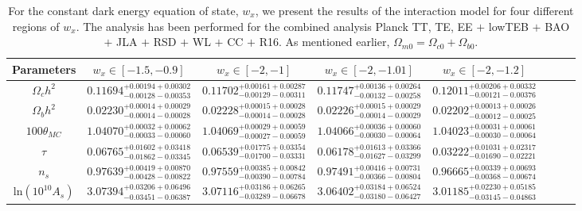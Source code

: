 \documentclass[superscriptaddress,oneolumn,secnumarabic,
amssymb,amsmath,nobibnotes,aps,prd,showpacs,nofootinbib]{revtex4}%
\begin{document}
\begin{itemize}
\begin{table}%
\caption{For the constant dark energy
equation of state, $w_x$, we present the results of the interaction model for
four different regions of $w_x$. The analysis has been performed for
the combined analysis Planck TT, TE, EE $+$ lowTEB $+$ BAO $+$ JLA $+$ RSD $+$ WL $+$ CC $+$ R16. As mentioned earlier, $\Omega_{m0}= \Omega_{c0}+\Omega_{b0}$.  }
\begin{tabular}{cccccccc}
\hline\hline
Parameters & $w_x \in [-1.5, -0.9]$ &  $w_x \in [-2, -1]$ & $w_x \in [-2, -1.01]$ &  $w_x \in [-2, -1.2]$
\\ \hline
$\Omega_ch^2$ & $ 0.11694_{-    0.00128-    0.00353}^{+    0.00194+    0.00302}$ & $    0.11702_{-    0.00129-    0.00311}^{+    0.00161+    0.00287}$ & $0.11747_{-    0.00132-    0.00258}^{+    0.00136+    0.00264}$ & $    0.12011_{-    0.00121-    0.00376}^{+    0.00206+    0.00332}$\\

$\Omega_bh^2$  &  $ 0.02230_{-    0.00014-    0.00028}^{+    0.00014+    0.00029}$ & $0.02228_{-    0.00014-    0.00028}^{+    0.00015+    0.00028}$ & $0.02226_{- 0.00014-    0.00029}^{+    0.00015+    0.00029}$ & $ 0.02202_{-    0.00012-    0.00025}^{+    0.00013+    0.00026}$\\

$100\theta_{MC}$ & $ 1.04070_{- 0.00033-    0.00060}^{+    0.00032+    0.00062}$ & $    1.04069_{-    0.00027-    0.00059}^{+ 0.00029+ 0.00059}$ & $1.04066_{-    0.00030-    0.00064}^{+    0.00036+    0.00060}$ &$ 1.04023_{- 0.00030-    0.00064}^{+    0.00031+    0.00061}$\\


$\tau$ &  $    0.06765_{-    0.01862-    0.03345}^{+    0.01602+    0.03418}$ & $    0.06539_{-    0.01700-    0.03331}^{+    0.01775+    0.03354}$ & $0.06178_{-    0.01627-    0.03299}^{+    0.01613+    0.03366}$ &$    0.03222_{-    0.01690-    0.02221}^{+    0.01031+    0.02317}$\\


$n_s$ &  $    0.97639_{-    0.00428-    0.00822}^{+    0.00419+    0.00870}$ & $    0.97559_{-    0.00390-    0.00784}^{+    0.00385+    0.00842}$ & $0.97491_{-    0.00366-    0.00804}^{+    0.00416+    0.00731}$ &$    0.96665_{-    0.00368-    0.00674}^{+    0.00339+    0.00693}$\\


$\mathrm{ln}(10^{10}A_s)$ &  $    3.07394_{-    0.03451-    0.06387}^{+    0.03206+    0.06496}$ & $    3.07116_{-    0.03289-    0.06678}^{+    0.03186+    0.06265}$ & $3.06402_{-    0.03180-    0.06427}^{+    0.03184+    0.06524}$ &$3.01185_{-    0.03145-    0.04863}^{+    0.02230+    0.05185}$\\



\end{tabular}
\end{table}
\end{itemize}
\end{document}
